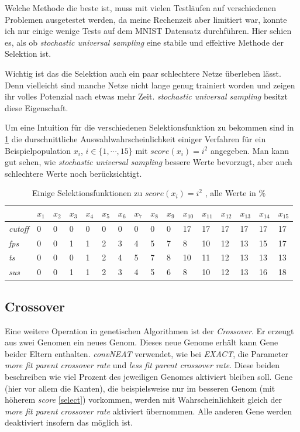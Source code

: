 \documentclass[]{scrartcl}
\begin{document}
			Welche Methode die beste ist, muss mit vielen Testläufen auf verschiedenen Problemen ausgetestet werden, da meine Rechenzeit aber limitiert war, konnte
			ich nur einige wenige Tests auf dem MNIST Datensatz durchführen. Hier schien es, als ob \textit{stochastic universal sampling}
			eine stabile und effektive Methode der Selektion ist.

			Wichtig ist das die Selektion auch ein paar schlechtere Netze überleben lässt. Denn vielleicht sind manche Netze nicht lange genug trainiert worden
			und zeigen ihr volles Potenzial nach etwas mehr Zeit. \textit{stochastic universal sampling} besitzt diese Eigenschaft.

			Um eine Intuition für die verschiedenen Selektionsfunktion zu bekommen sind in \ref{tab:select} die durschnittliche Auswahlwahrscheinlichkeit
			einiger Verfahren für ein Beispielpopulation $x_i$, $i \in \{1, \cdots, 15\}$ mit $score(x_i) = i^2$ angegeben.
			Man kann gut sehen, wie \textit{stochastic universal sampling} bessere Werte bevorzugt, aber auch schlechtere Werte noch berücksichtigt.

			\begin{table}[h]
				\centering
				\begin{tabular}{llllllllllllllll}
					\toprule
					& $x_1$ & $x_2$ & $x_3$ & $x_4$ & $x_5$ & $x_6$ & $x_7$ & $x_8$ & $x_9$ & $x_{10}$ & $x_{11}$ & $x_{12}$ & $x_{13}$ & $x_{14}$ & $x_{15}$ \\
					\midrule
					\textit{cutoff} & 0 & 0 & 0 & 0 & 0 & 0 & 0 & 0 & 0 & 17 & 17 & 17 & 17 & 17 & 17 \\
					\textit{fps} & 0 & 0 & 1 & 1 & 2 & 3 & 4 & 5 & 7 & 8 & 10 & 12 & 13 & 15 & 17 \\
					\textit{ts} & 0 & 0 & 0 & 1 & 2 & 4 & 5 & 7 & 8 & 10 & 11 & 12 & 13 & 13 & 13 \\
					\textit{sus} & 0 & 0 & 1 & 1 & 2 & 3 & 4 & 5 & 6 & 8 & 10 & 12 & 13 & 16 & 18 \\
					\bottomrule
				\end{tabular}
				\caption{Einige Selektionsfunktionen zu $score(x_i) = i^2$ , alle Werte in $\%$}
				\label{tab:select}
			\end{table}
				
		
		\subsection{Crossover} \label{cross}

			Eine weitere Operation in genetischen Algorithmen ist der \textit{Crossover}. Er erzeugt aus zwei Genomen ein neues Genom.
			Dieses neue Genome erhält kann Gene beider Eltern enthalten. \textit{convNEAT} verwendet, wie bei \textit{EXACT},
			die Parameter \textit{more fit parent crossover rate} und \textit{less fit parent crossover rate}.
			Diese beiden beschreiben wie viel Prozent des jeweiligen Genomes aktiviert bleiben soll.
			Gene (hier vor allem die Kanten), die beispielsweise nur im besseren Genom (mit höherem \textit{score} \ref{select}) vorkommen,
			werden mit Wahrscheinlichkeit gleich der \textit{more fit parent crossover rate} aktiviert übernommen.
			Alle anderen Gene werden deaktiviert insofern das möglich ist.
\end{document}
